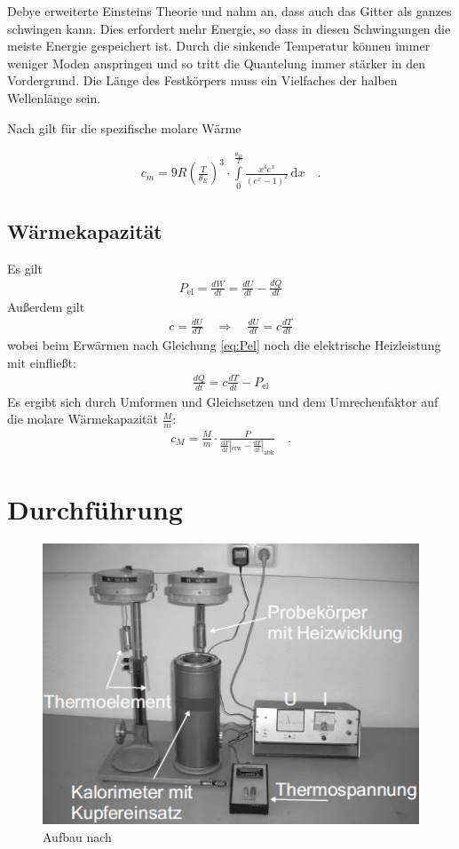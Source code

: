\documentclass[12pt,a4paper,titlepage,headinclude,bibtotoc]{scrartcl}
\newcommand{\dif}{\ensuremath{\mathrm{d}}}
\begin{document}
Debye erweiterte Einsteins Theorie und nahm an, dass auch das Gitter als ganzes schwingen kann.
Dies erfordert mehr Energie, so dass in diesen Schwingungen die meiste Energie gespeichert ist.
Durch die sinkende Temperatur können immer weniger Moden anspringen und so tritt die Quantelung immer stärker in den Vordergrund.
Die Länge des Festkörpers muss ein Vielfaches der halben Wellenlänge sein.

Nach \cite[S. 444]{demtroeder3} gilt für die spezifische molare Wärme

\begin{align}
	c_m=9R \left(\frac{T}{\theta_E}\right)^3\cdot\int\limits_0^\frac{\theta_D}{T} \frac{x^4 e^x}{(e^x-1)^2} \,\dif x\quad .	\label{eq:debye}
\end{align}


\subsection{Wärmekapazität}
Es gilt 
\begin{align}
	P_\text{el}=\frac{dW}{dt}=\frac{dU}{dt}-\frac{dQ}{dt}\label{eq:Pel}
\end{align}
Außerdem gilt
\begin{align*}
	c=\frac{dU}{dT}\quad\Rightarrow\quad \frac{dU}{dt}=c\frac{dT}{dt}
\end{align*}
wobei beim Erwärmen nach Gleichung \eqref{eq:Pel} noch die elektrische Heizleistung mit einfließt:
\begin{align}
	\frac{dQ}{dt}=c\frac{dT}{dt}-P_\text{el}
\end{align}
Es ergibt sich durch Umformen und Gleichsetzen und dem Umrechenfaktor auf die molare Wärmekapazität $\frac{M}{m}$:
\begin{align}
	c_M=\frac{M}{m}\cdot\frac{P}{\frac{\dif T}{\dif t}|_\text{erw}-\frac{\dif T}{\dif t}|_\text{abk}}\label{eq:molWaerme}\quad .
\end{align}

\section{Durchführung}
\label{sec:durchfuehrung}

\begin{figure}[h]
	\centering
	\includegraphics{Aufbau}
	\caption{Aufbau nach \cite[23.4.15, 13 Uhr]{lp25}}
	\label{fig:aufbau}
\end{figure}
\end{document}
